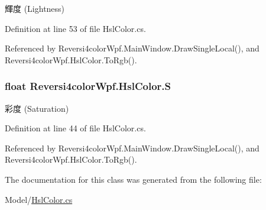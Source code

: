 輝度 (Lightness) 



Definition at line 53 of file Hsl\+Color.\+cs.



Referenced by Reversi4color\+Wpf.\+Main\+Window.\+Draw\+Single\+Local(), and Reversi4color\+Wpf.\+Hsl\+Color.\+To\+Rgb().

\subsubsection[{\texorpdfstring{S}{S}}]{\setlength{\rightskip}{0pt plus 5cm}float Reversi4color\+Wpf.\+Hsl\+Color.\+S\hspace{0.3cm}{\ttfamily [get]}}\hypertarget{class_reversi4color_wpf_1_1_hsl_color_add0e2fa688031f37fba1108a6c6cbd2d}{}\label{class_reversi4color_wpf_1_1_hsl_color_add0e2fa688031f37fba1108a6c6cbd2d}


彩度 (Saturation) 



Definition at line 44 of file Hsl\+Color.\+cs.



Referenced by Reversi4color\+Wpf.\+Main\+Window.\+Draw\+Single\+Local(), and Reversi4color\+Wpf.\+Hsl\+Color.\+To\+Rgb().



The documentation for this class was generated from the following file\+:\begin{DoxyCompactItemize}
\item 
Model/\hyperlink{_hsl_color_8cs}{Hsl\+Color.\+cs}\end{DoxyCompactItemize}
